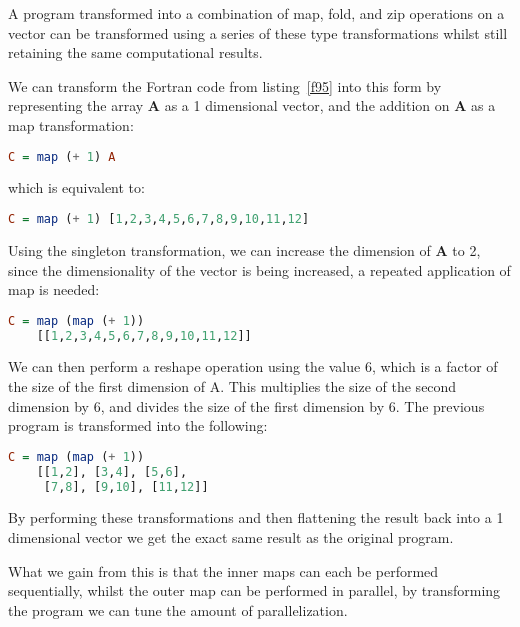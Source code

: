 A program transformed into a combination of map, fold, and zip operations on a vector can be transformed
using a series of these type transformations whilst still retaining the same computational results.

We can transform the Fortran code from listing~\ref{f95} into this form by
representing the array \textbf{A} as a 1 dimensional vector, and the addition on \textbf{A} as a map transformation:

\begin{lstlisting}[language=Haskell, frame=none, numbers=none]
C = map (+ 1) A
\end{lstlisting}

which is equivalent to:
\begin{lstlisting}[language=Haskell, frame=none, numbers=none]
C = map (+ 1) [1,2,3,4,5,6,7,8,9,10,11,12]
\end{lstlisting}

Using the singleton transformation, we can increase the dimension of \textbf{A} to 2, since
the dimensionality of the vector is being increased, a repeated application of map is needed:
\begin{lstlisting}[language=Haskell, frame = none, numbers= none]
C = map (map (+ 1)) 
    [[1,2,3,4,5,6,7,8,9,10,11,12]]
\end{lstlisting} 

We can then perform a reshape operation using the value 6, which is a factor of the size of the
first dimension of A. This multiplies the size of the second dimension by 6, and divides the size
of the first dimension by 6. The previous program is transformed into the following:
\begin{lstlisting}[language=Haskell, frame=none, numbers=none]
C = map (map (+ 1)) 
    [[1,2], [3,4], [5,6], 
     [7,8], [9,10], [11,12]]
\end{lstlisting}

By performing these transformations and then flattening the result back into a 1 dimensional vector
we get the exact same result as the original program.

What we gain from this is that the inner maps can each be performed sequentially, whilst the outer map
can be performed in parallel, by transforming the program we can tune the amount of parallelization. 
